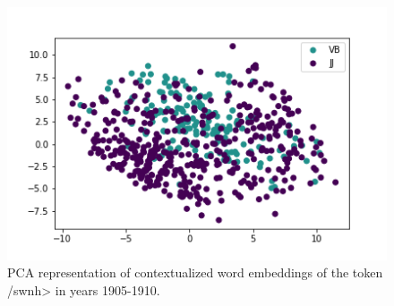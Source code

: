 \documentclass[10pt, a4paper]{article}
\begin{document}
\begin{figure}[!h]
\begin{center}
\includegraphics[scale=0.5]{code/embeddings_by_pos/שונה_1905.png}
\caption{PCA representation of contextualized word embeddings of the token \</swnh> in years 1905-1910.}
\label{embeddings_pos}
\end{center}
\end{figure}


\end{document}
